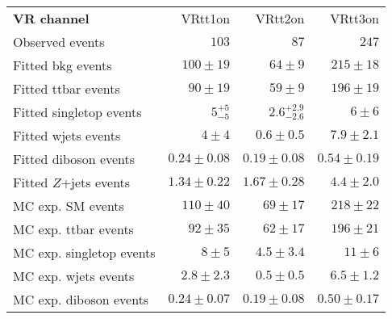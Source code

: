 

\begin{table}
\begin{center}
\setlength{\tabcolsep}{0.0pc}
{\small
\begin{tabular*}{\textwidth}{@{\extracolsep{\fill}}lrrr}
\noalign{\smallskip}\hline\noalign{\smallskip}
{\textbf{ VR channel}}           & VRtt1on            & VRtt2on            & VRtt3on              \\[-0.05cm]
\noalign{\smallskip}\hline\noalign{\smallskip}
Observed events          & $103$              & $87$              & $247$                    \\
\noalign{\smallskip}\hline\noalign{\smallskip}
Fitted bkg events         & $100 \pm 19$          & $64 \pm 9$          & $215 \pm 18$              \\
\noalign{\smallskip}\hline\noalign{\smallskip}
        Fitted ttbar events         & $90 \pm 19$          & $59 \pm 9$          & $196 \pm 19$              \\
        Fitted singletop events         & $5_{-5}^{+5}$          & $2.6_{-2.6}^{+2.9}$          & $6 \pm 6$              \\
        Fitted wjets events         & $4 \pm 4$          & $0.6 \pm 0.5$          & $7.9 \pm 2.1$              \\
        Fitted diboson events         & $0.24 \pm 0.08$          & $0.19 \pm 0.08$          & $0.54 \pm 0.19$              \\
        Fitted $Z$+jets events         & $1.34 \pm 0.22$          & $1.67 \pm 0.28$          & $4.4 \pm 2.0$              \\
 \noalign{\smallskip}\hline\noalign{\smallskip}
MC exp. SM events              & $110 \pm 40$          & $69 \pm 17$          & $218 \pm 22$              \\
\noalign{\smallskip}\hline\noalign{\smallskip}
        MC exp. ttbar events         & $92 \pm 35$          & $62 \pm 17$          & $196 \pm 21$              \\
        MC exp. singletop events         & $8 \pm 5$          & $4.5 \pm 3.4$          & $11 \pm 6$              \\
        MC exp. wjets events         & $2.8 \pm 2.3$          & $0.5 \pm 0.5$          & $6.5 \pm 1.2$              \\
        MC exp. diboson events         & $0.24 \pm 0.07$          & $0.19 \pm 0.08$          & $0.50 \pm 0.17$              \\

\end{tabular*}}
\end{center}
\end{table}
